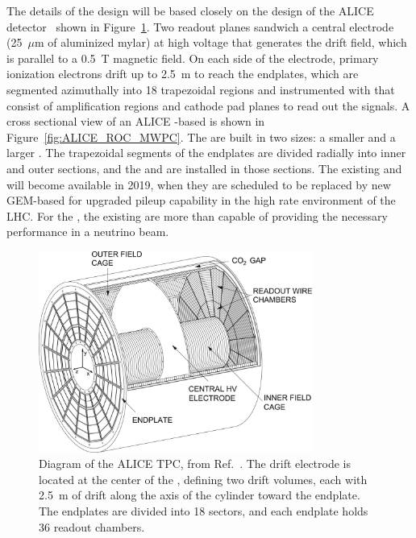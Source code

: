 The details of the  design will be based closely on the design of the ALICE detector~\cite{Dellacasa:2000bm} shown in Figure~\ref{fig:ALICETPC}. Two readout planes sandwich a central  electrode (25~$\mu$m of aluminized mylar) at high voltage that generates the drift field, which is parallel to a \SI{0.5}{T} magnetic field. On each side of the electrode, primary ionization electrons drift up to \SI{2.5}{m} to reach the endplates, which are segmented azimuthally into 18 trapezoidal regions and instrumented with  that consist of  amplification regions and cathode pad planes to read out the signals. A cross sectional view of an ALICE -based  is shown in Figure~\ref{fig:ALICE_ROC_MWPC}. The  are built in two sizes: a smaller  and a larger . The trapezoidal segments of the endplates are divided radially into inner and outer sections, and the  and  are installed in those sections. The existing  and  will become available in 2019, when they are scheduled to be replaced by new GEM-based  for upgraded pileup capability in the high rate environment of the LHC. For the  , the existing  are more than capable of providing the necessary performance in a neutrino beam.  

\begin{figure}[h]
    \centering
    \includegraphics[width=0.8\textwidth]{graphics/alice_tpc_highres.jpg}
    \caption{Diagram of the ALICE TPC, from Ref.~\cite{Alme:2010ke}. The drift  electrode is located at the center of the , defining two drift volumes, each with 2.5~m of drift along the axis of the cylinder toward the endplate. The endplates are divided into 18 sectors, and each endplate holds 36 readout chambers.}
    \label{fig:ALICETPC}
\end{figure}


